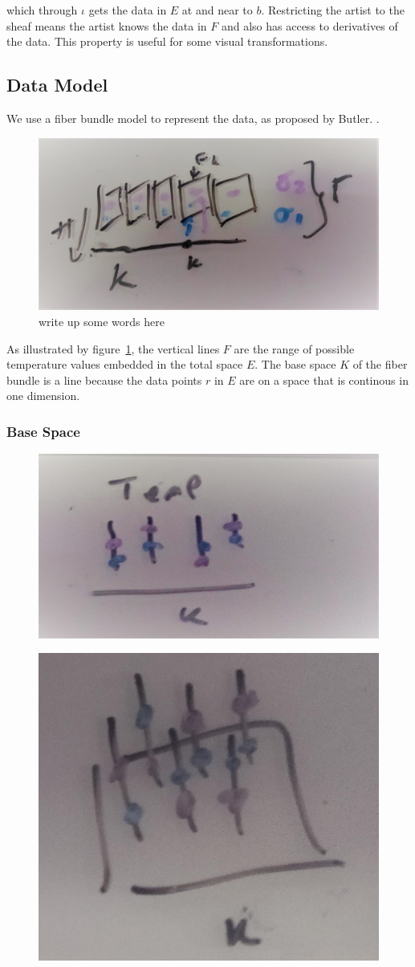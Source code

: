 \documentclass[../main.tex]{subfiles}
\begin{document}
which through $\iota$ gets the data in $E$ at and near to $b$. Restricting the artist to the sheaf means the artist knows the data in $F$ and also has access to derivatives of the data. This property is useful for some visual transformations. 

\subsection{Data Model}

We use a fiber bundle model to represent the data, as proposed by Butler.  
\cite{butlerVectorBundleClassesForm1992,butlerVisualizationModelBased1989}.
\begin{figure}[ht]
    \includegraphics[width=.2\linewidth]{figures/sections/math/fiberbundle.png}
    \caption{write up some words here}
    \label{fig:fiberbundle}
\end{figure}

As illustrated by figure~\ref{fig:fiberbundle}, the vertical lines $F$ are the range of possible temperature values embedded in the total space $E$. The base space $K$ of the fiber bundle is a line because the data points $r$ in $E$ are on a space that is  continous in one dimension. 

\subsubsection{Base Space}


\begin{figure}[ht]
    \includegraphics[width=0.2\linewidth]{figures/sections/math/temp_1k.png}
    \label{fig:k_data}
\end{figure}

\begin{figure}[ht]
    \includegraphics[width=0.2\linewidth]{figures/sections/math/temp_2k.png}
\end{figure}
\end{document}
